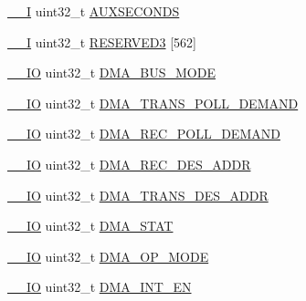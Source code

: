\begin{DoxyCompactItemize}
\item 
\hyperlink{core__sc300_8h_af63697ed9952cc71e1225efe205f6cd3}{\+\_\+\+\_\+I} uint32\+\_\+t \hyperlink{struct_l_p_c___e_n_e_t___t_ad167767881a51644b80b26acf8d31f31}{A\+U\+X\+S\+E\+C\+O\+N\+DS}
\item 
\hyperlink{core__sc300_8h_af63697ed9952cc71e1225efe205f6cd3}{\+\_\+\+\_\+I} uint32\+\_\+t \hyperlink{struct_l_p_c___e_n_e_t___t_abe64ca5c6817fc151f9168e346ba8f13}{R\+E\+S\+E\+R\+V\+E\+D3} \mbox{[}562\mbox{]}
\item 
\hyperlink{core__sc300_8h_aec43007d9998a0a0e01faede4133d6be}{\+\_\+\+\_\+\+IO} uint32\+\_\+t \hyperlink{struct_l_p_c___e_n_e_t___t_a91a9de6714bfb2f4092319e6213b6fda}{D\+M\+A\+\_\+\+B\+U\+S\+\_\+\+M\+O\+DE}
\item 
\hyperlink{core__sc300_8h_aec43007d9998a0a0e01faede4133d6be}{\+\_\+\+\_\+\+IO} uint32\+\_\+t \hyperlink{struct_l_p_c___e_n_e_t___t_ab1393b581be14a9c107aaac597b2eff3}{D\+M\+A\+\_\+\+T\+R\+A\+N\+S\+\_\+\+P\+O\+L\+L\+\_\+\+D\+E\+M\+A\+ND}
\item 
\hyperlink{core__sc300_8h_aec43007d9998a0a0e01faede4133d6be}{\+\_\+\+\_\+\+IO} uint32\+\_\+t \hyperlink{struct_l_p_c___e_n_e_t___t_ad240798c32ab83a8fac9c52e090d2270}{D\+M\+A\+\_\+\+R\+E\+C\+\_\+\+P\+O\+L\+L\+\_\+\+D\+E\+M\+A\+ND}
\item 
\hyperlink{core__sc300_8h_aec43007d9998a0a0e01faede4133d6be}{\+\_\+\+\_\+\+IO} uint32\+\_\+t \hyperlink{struct_l_p_c___e_n_e_t___t_a49e582380c6d9e124473e0e14b081f9c}{D\+M\+A\+\_\+\+R\+E\+C\+\_\+\+D\+E\+S\+\_\+\+A\+D\+DR}
\item 
\hyperlink{core__sc300_8h_aec43007d9998a0a0e01faede4133d6be}{\+\_\+\+\_\+\+IO} uint32\+\_\+t \hyperlink{struct_l_p_c___e_n_e_t___t_a2cea74910e5e2f2108ec4af2ae6de069}{D\+M\+A\+\_\+\+T\+R\+A\+N\+S\+\_\+\+D\+E\+S\+\_\+\+A\+D\+DR}
\item 
\hyperlink{core__sc300_8h_aec43007d9998a0a0e01faede4133d6be}{\+\_\+\+\_\+\+IO} uint32\+\_\+t \hyperlink{struct_l_p_c___e_n_e_t___t_a0e8f4d72df361d989a8cc77e6036874a}{D\+M\+A\+\_\+\+S\+T\+AT}
\item 
\hyperlink{core__sc300_8h_aec43007d9998a0a0e01faede4133d6be}{\+\_\+\+\_\+\+IO} uint32\+\_\+t \hyperlink{struct_l_p_c___e_n_e_t___t_a576c7b0d576806210b164aaf6387a1df}{D\+M\+A\+\_\+\+O\+P\+\_\+\+M\+O\+DE}
\item 
\hyperlink{core__sc300_8h_aec43007d9998a0a0e01faede4133d6be}{\+\_\+\+\_\+\+IO} uint32\+\_\+t \hyperlink{struct_l_p_c___e_n_e_t___t_a1705fa63c0fcd4956a9ee77118a5a15b}{D\+M\+A\+\_\+\+I\+N\+T\+\_\+\+EN}
\item 

\end{DoxyCompactItemize}
